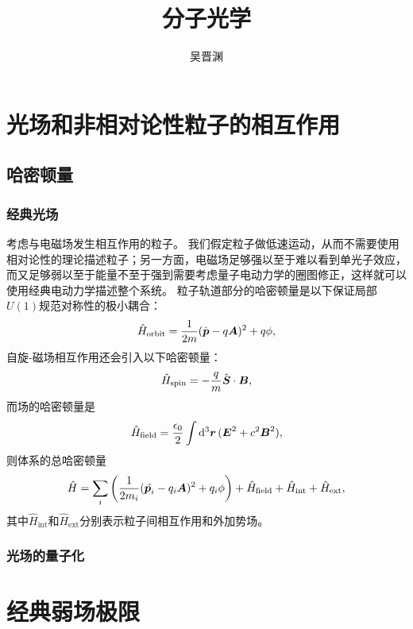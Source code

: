 \documentclass[UTF8, a4paper]{ctexart}
\title{分子光学}
\author{吴晋渊}
\begin{document}
\maketitle

\section{光场和非相对论性粒子的相互作用}

\subsection{哈密顿量}

\subsubsection{经典光场}

考虑与电磁场发生相互作用的粒子。
我们假定粒子做低速运动，从而不需要使用相对论性的理论描述粒子；另一方面，电磁场足够强以至于难以看到单光子效应，而又足够弱以至于能量不至于强到需要考虑量子电动力学的圈图修正，这样就可以使用经典电动力学描述整个系统。
粒子轨道部分的哈密顿量是以下保证局部$U(1)$规范对称性的极小耦合：
\begin{equation}
    \hat{H}_\text{orbit} = \frac{1}{2m} (\hat{\vb*{p}} - q \vb*{A})^2 + q \phi,
\end{equation}
自旋-磁场相互作用还会引入以下哈密顿量：
\begin{equation}
    \hat{H}_\text{spin} = - \frac{q}{m} \hat{\vb*{S}} \cdot \vb*{B},
\end{equation}
而场的哈密顿量是
\begin{equation}
    \hat{H}_\text{field} = \frac{\epsilon_0}{2} \int \dd[3]{\vb*{r}} (\vb*{E}^2 + c^2 \vb*{B}^2),
\end{equation}
则体系的总哈密顿量
\begin{equation}
    \hat{H} = \sum_i \left( \frac{1}{2m_i} (\hat{\vb*{p}_i} - q_i \vb*{A})^2 + q_i \phi \right) + \hat{H}_\text{field} + \hat{H}_\text{int} + \hat{H}_\text{ext},
\end{equation}
其中$\hat{H}_\text{int}$和$\hat{H}_\text{ext}$分别表示粒子间相互作用和外加势场。

\subsubsection{光场的量子化}

\section{经典弱场极限}
\end{document}
